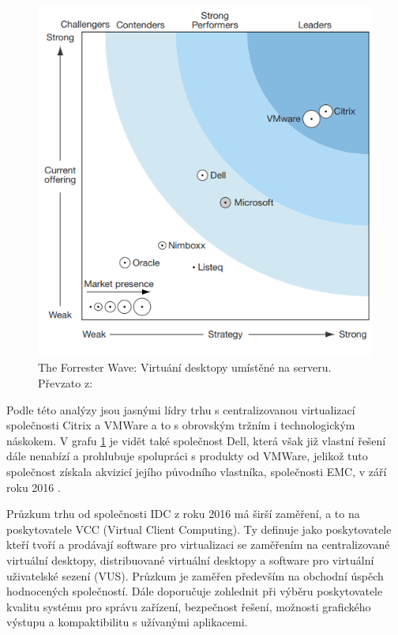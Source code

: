  \begin{figure}[h!]
\includegraphics[width=13cm]{img/Forrester_Wave}
\caption{The Forrester Wave: Virtuání desktopy umístěné na serveru. Převzato z: \cite{ForresterWave}} 
\label{Forrester_Wave}
\centering
\end{figure}

Podle této analýzy jsou jasnými lídry trhu s centralizovanou virtualizací společnosti Citrix a VMWare a to s obrovským tržním i technologickým náskokem. V grafu \ref{Forrester_Wave} je vidět také společnost Dell, která však již vlastní řešení dále nenabízí a prohlubuje spolupráci s produkty od VMWare, jelikož tuto společnost získala akvizicí jejího původního vlastníka, společnosti EMC, v září roku 2016 \cite{DellBuyEMC}.

Průzkum trhu od společnosti IDC \cite{IDCVCC} z roku 2016 má širší zaměření, a to na poskytovatele VCC (Virtual Client Computing). Ty definuje jako poskytovatele kteří tvoří a prodávají software pro virtualizaci se zaměřením na centralizované virtuální desktopy, distribuované virtuální desktopy a software pro virtuální uživatelské sezení (VUS). Průzkum je zaměřen především na obchodní úspěch hodnocených společností. Dále doporučuje zohlednit při výběru poskytovatele kvalitu systému pro správu zařízení, bezpečnost řešení, možnosti grafického výstupu a kompaktibilitu s užívanými aplikacemi. 

